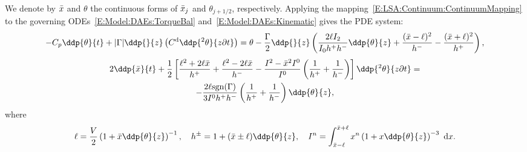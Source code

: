 We denote by $\bar{x}$ and $\theta$ the continuous forms of $\bar{x}_j$ and $ \theta_{j+1/2}$, respectively. Applying the mapping~\eqref{E:LSA:Continuum:ContinuumMapping} to the governing ODEs~\eqref{E:Model:DAEs:TorqueBal} and~\eqref{E:Model:DAEs:Kinematic} gives the PDE system:
\begin{equation}\label{E:LSA:Continuum:TorqueBalancePDE}
-C_p\ddp{\theta}{t} + |\Gamma|\ddp{}{z}\left(\viscdamp\ddp{^2 \theta}{z \partial t}\right) = \theta - \frac{\Gamma}{2}\ddp{}{z}\left(\frac{2\ell I_2}{I_0h^+ h^-}\ddp{\theta}{z} + \frac{(\xbar - \ell)^2 }{h^-} - \frac{(\xbar + \ell)^2 }{h^+}\right),
\end{equation}
\begin{multline}\label{E:LSA:Continuum:KinematicPDE}
2\ddp{\xbar}{t} + \frac{1}{2} \left[\frac{\ell^2 + 2\ell \xbar}{h^+} + \frac{\ell^2 - 2\ell \xbar}{h^-} -  \frac{I^2 - \xbar^2 I^0}{I^0} \left(\frac{1}{h^+} + \frac{1}{h^-}\right)\right]\ddp{^2\theta}{z \partial t} =\\
-\frac{2\ell\sgn(\Gamma)}{3I^0 h^+ h^-} \left(\frac{1}{h^+} + \frac{1}{h^-}\right)\ddp{\theta}{z},
\end{multline}
where
\begin{equation}\label{E:LSA:Continuum:Relationships1}
\ell = \frac{V}{2} \left(1 + \xbar\ddp{\theta}{z}\right)^{-1},\quad h^{\pm} = 1 + (\bar{x}\pm \ell)\ddp{\theta}{z}, \quad I^n = \int_{\xbar - \ell}^{\xbar+\ell} x^n\left(1 + x \ddp{\theta}{z}\right)^{-3} ~\mathrm{d}x.
\end{equation}

